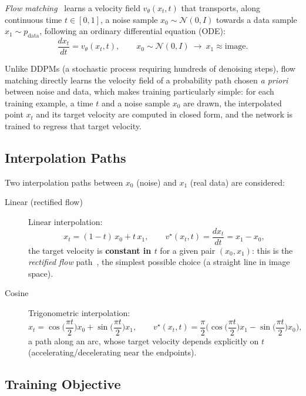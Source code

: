 \documentclass[11pt,a4paper]{article}
\begin{document}
\emph{Flow matching}~\cite{lipman2023flow} learns a velocity field
$v_\theta(x_t, t)$ that transports, along continuous time $t\in[0,1]$, a
noise sample $x_0 \sim \mathcal{N}(0, I)$ towards a data sample $x_1 \sim
p_{\mathrm{data}}$, following an ordinary differential equation (ODE):
\[
  \frac{dx_t}{dt} = v_\theta(x_t, t), \qquad x_0 \sim \mathcal{N}(0, I)
  \ \longrightarrow\ x_1 \approx \text{image}.
\]

Unlike DDPMs (a stochastic process requiring hundreds of denoising steps),
flow matching directly learns the velocity field of a probability path
chosen \emph{a priori} between noise and data, which makes training
particularly simple: for each training example, a time $t$ and a noise
sample $x_0$ are drawn, the interpolated point $x_t$ and its target velocity
are computed in closed form, and the network is trained to regress that
target velocity.

\subsection{Interpolation Paths}

Two interpolation paths between $x_0$ (noise) and $x_1$ (real data) are
considered:

\begin{description}
  \item[Linear (rectified flow)] Linear interpolation:
    \[
      x_t = (1-t)\,x_0 + t\,x_1, \qquad
      v^{\star}(x_t, t) = \frac{dx_t}{dt} = x_1 - x_0,
    \]
    the target velocity is \textbf{constant in $t$} for a given pair
    $(x_0,x_1)$: this is the \emph{rectified flow}
    path~\cite{liu2023rectifiedflow}, the simplest possible choice (a
    straight line in image space).
  \item[Cosine] Trigonometric interpolation:
    \[
      x_t = \cos\!\Big(\frac{\pi t}{2}\Big) x_0 + \sin\!\Big(\frac{\pi t}{2}\Big) x_1,
      \qquad
      v^{\star}(x_t,t) = \frac{\pi}{2}\Big(\cos\!\Big(\frac{\pi t}{2}\Big) x_1 -
      \sin\!\Big(\frac{\pi t}{2}\Big) x_0\Big),
    \]
    a path along an arc, whose target velocity depends explicitly on $t$
    (accelerating/decelerating near the endpoints).
\end{description}

\subsection{Training Objective}
\end{document}
